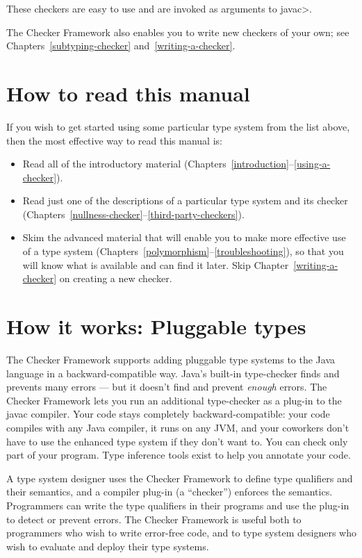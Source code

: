\noindent
These checkers are easy to use and are invoked as arguments to \<javac>.


The Checker Framework also enables you to write new checkers of your
own; see Chapters~\ref{subtyping-checker} and~\ref{writing-a-checker}.


\section{How to read this manual\label{how-to-read-this-manual}}

If you wish to get started using some particular type system from the list
above, then the most effective way to read this manual is:

\begin{itemize}
\item
  Read all of the introductory material
  (Chapters~\ref{introduction}--\ref{using-a-checker}).
\item
  Read just one of the descriptions of a particular type system and its
  checker (Chapters~\ref{nullness-checker}--\ref{third-party-checkers}).
\item
  Skim the advanced material that will enable you to make more effective
  use of a type system
  (Chapters~\ref{polymorphism}--\ref{troubleshooting}), so that you will
  know what is available and can find it later.  Skip
  Chapter~\ref{writing-a-checker} on creating a new checker.
\end{itemize}


\section{How it works:  Pluggable types\label{pluggable-types}}

The Checker Framework supports adding
pluggable type systems to the Java language in a backward-compatible way.
Java's built-in type-checker finds and prevents many errors --- but it
doesn't find and prevent \emph{enough} errors.  The Checker Framework lets you
run an additional type-checker as a plug-in to the javac compiler.  Your
code stays completely backward-compatible:  your code compiles with any
Java compiler, it runs on any JVM, and your coworkers don't have to use the
enhanced type system if they don't want to.  You can check only part of
your program.  Type inference tools exist to help you annotate your
code.


A type system designer uses the Checker Framework to define type qualifiers
and their semantics, and a
compiler plug-in (a ``checker'') enforces the semantics.  Programmers can
write the type qualifiers in their programs and use the plug-in to detect
or prevent errors.  The Checker Framework is useful both to programmers who
wish to write error-free code, and to type system designers who wish to
evaluate and deploy their type systems.



